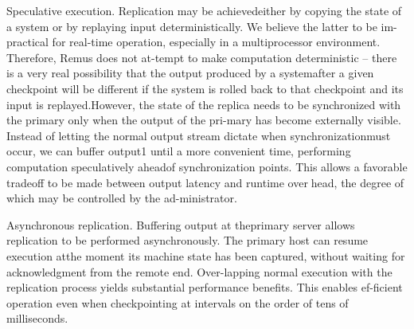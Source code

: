 Speculative execution. Replication may be achievedeither by copying the state of a system or by replaying
input deterministically. We believe the latter to be im-practical for real-time operation, especially in a multiprocessor environment. Therefore, Remus does not at-tempt to make computation deterministic -- there is a
very real possibility that the output produced by a systemafter a given checkpoint will be different if the system is
rolled back to that checkpoint and its input is replayed.However, the state of the replica needs to be synchronized with the primary only when the output of the pri-mary has become externally visible. Instead of letting
the normal output stream dictate when synchronizationmust occur, we can buffer output1 until a more convenient time, performing computation speculatively aheadof synchronization points. This allows a favorable tradeoff to be made between output latency and runtime overhead, the degree of which may be controlled by the ad-ministrator.

Asynchronous replication. Buffering output at theprimary server allows replication to be performed asynchronously. The primary host can resume execution atthe moment its machine state has been captured, without
waiting for acknowledgment from the remote end. Over-lapping normal execution with the replication process
yields substantial performance benefits. This enables ef-ficient operation even when checkpointing at intervals on
the order of tens of milliseconds.

